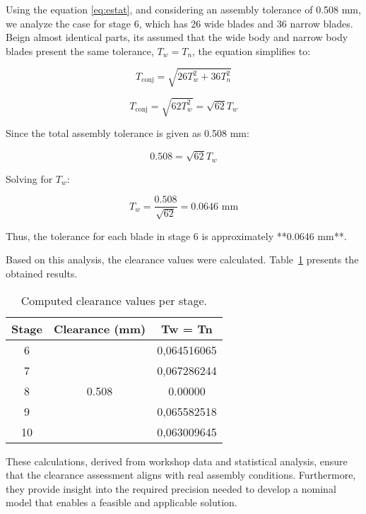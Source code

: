 Using the equation \ref{eq:estat}, and considering an assembly tolerance of 0.508 mm, we analyze the case for stage 6, which has 26 wide blades and 36 narrow blades. Beign almost identical parts, its assumed that the wide body and narrow body blades present the same tolerance, \( T_w = T_n \), the equation simplifies to:

\begin{equation}
    T_{\text{conj}} = \sqrt{26T_w^2 + 36T_n^2}
\end{equation}

\begin{equation}
    T_{\text{conj}} = \sqrt{62T_w^2} = \sqrt{62} T_w
\end{equation}

Since the total assembly tolerance is given as 0.508 mm:

\begin{equation}
    0.508 = \sqrt{62} T_w
\end{equation}

Solving for \( T_w \):

\begin{equation}
    T_w = \frac{0.508}{\sqrt{62}} = 0.0646 \text{ mm}
\end{equation}

Thus, the tolerance for each blade in stage 6 is approximately **0.0646 mm**.

Based on this analysis, the clearance values were calculated. Table~\ref{tab:clearance} presents the obtained results.

\begin{table}[h]
    \centering
    \begin{tabular}{@{}ccc@{}}
        \toprule
        Stage & Clearance (mm) & Tw = Tn \\ 
        \midrule
        6  & & 0,064516065    \\ 
        7  &   & 0,067286244    \\ 
        8  & 0.508  & 0.00000 \\ 
        9  &   & 0,065582518    \\ 
        10 &   & 0,063009645    \\ 
        \bottomrule
    \end{tabular}
    \caption{Computed clearance values per stage.}
    \label{tab:clearance}
\end{table}

These calculations, derived from workshop data and statistical analysis, ensure that the clearance assessment aligns with real assembly conditions. Furthermore, they provide insight into the required precision needed to develop a nominal model that enables a feasible and applicable solution.


